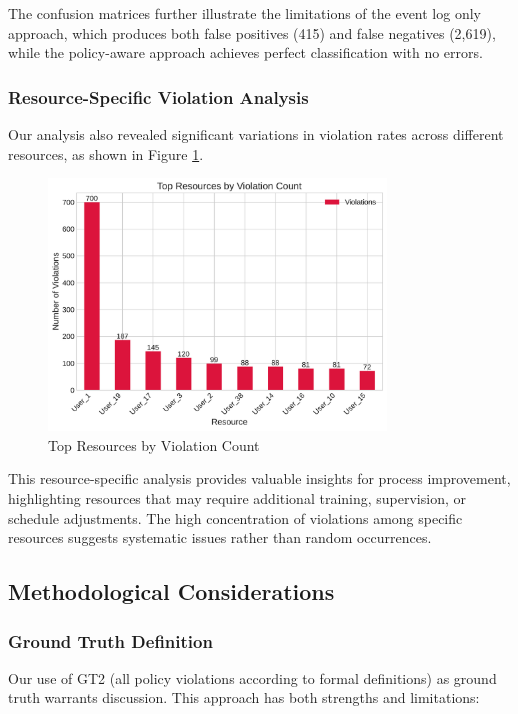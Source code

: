 The confusion matrices further illustrate the limitations of the event log only approach, which produces both false positives (415) and false negatives (2,619), while the policy-aware approach achieves perfect classification with no errors.

\subsubsection{Resource-Specific Violation Analysis}

Our analysis also revealed significant variations in violation rates across different resources, as shown in Figure \ref{fig:resource-violations}.

\begin{figure}[h]
\centering
\includegraphics[width=0.8\textwidth]{figures/violations_by_resource.pdf}
\caption{Top Resources by Violation Count}
\label{fig:resource-violations}
\end{figure}

This resource-specific analysis provides valuable insights for process improvement, highlighting resources that may require additional training, supervision, or schedule adjustments. The high concentration of violations among specific resources suggests systematic issues rather than random occurrences.

\subsection{Methodological Considerations}

\subsubsection{Ground Truth Definition}
Our use of GT2 (all policy violations according to formal definitions) as ground truth warrants discussion. This approach has both strengths and limitations:

